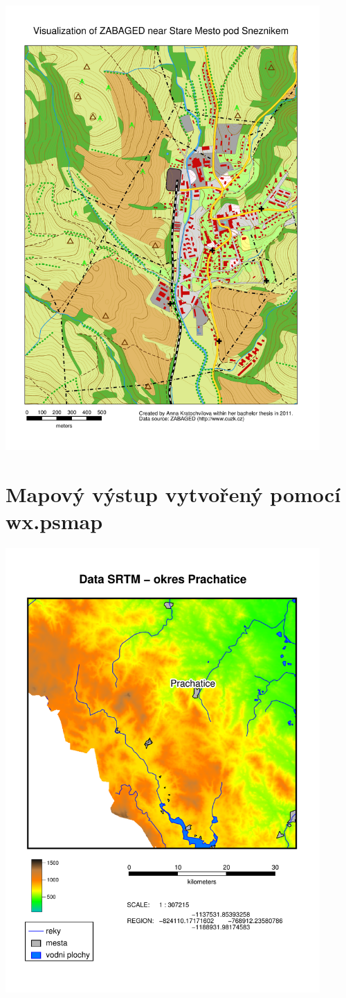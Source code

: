 \documentclass[a4paper,12pt,draft]{article}
\begin{document}
\begin{center}
\includegraphics[width=0.9\textwidth]
{./map_vystupy/psmap/zabaged.pdf}
\end{center}

\else
\section{Mapový výstup vytvořený pomocí wx.psmap}
\label{priloha:vystupy:psmap}
\centering
\includegraphics[width=0.9\textwidth]{./map_vystupy/psmap/dem_srtm.pdf}
\fi
\end{document}
